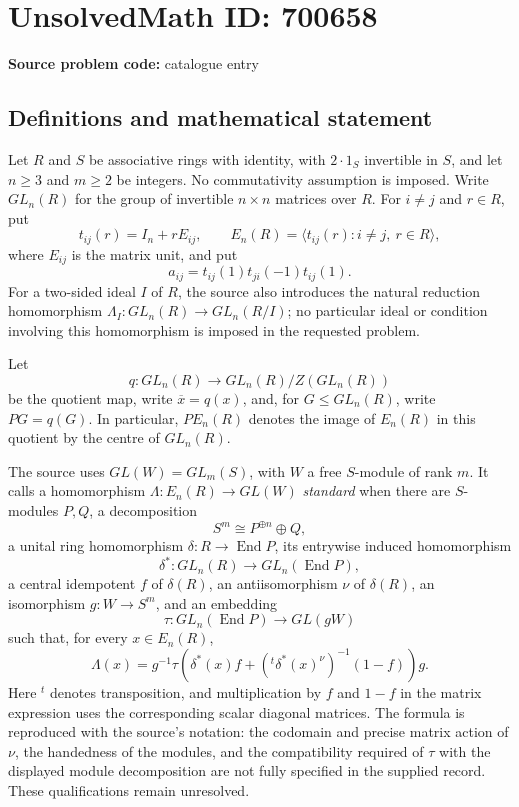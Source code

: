 \documentclass[11pt]{article}
\begin{document}
\section*{UnsolvedMath ID: 700658}
\textbf{Source problem code:} catalogue entry
\subsection{Definitions and mathematical statement}
Let \(R\) and \(S\) be associative rings with identity, with \(2\cdot 1_S\) invertible in \(S\), and let \(n\geq 3\) and \(m\geq 2\) be integers. No commutativity assumption is imposed. Write \(GL_n(R)\) for the group of invertible \(n\times n\) matrices over \(R\). For \(i\neq j\) and \(r\in R\), put
\[
t_{ij}(r)=I_n+rE_{ij},\qquad
E_n(R)=\langle t_{ij}(r):i\neq j,\ r\in R\rangle,
\]
where \(E_{ij}\) is the matrix unit, and put
\[
a_{ij}=t_{ij}(1)t_{ji}(-1)t_{ij}(1).
\]
For a two-sided ideal \(I\) of \(R\), the source also introduces the natural reduction homomorphism \(\Lambda_I:GL_n(R)\to GL_n(R/I)\); no particular ideal or condition involving this homomorphism is imposed in the requested problem.

Let
\[
q:GL_n(R)\longrightarrow GL_n(R)/Z(GL_n(R))
\]
be the quotient map, write \(\overline{x}=q(x)\), and, for \(G\leq GL_n(R)\), write \(PG=q(G)\). In particular, \(PE_n(R)\) denotes the image of \(E_n(R)\) in this quotient by the centre of \(GL_n(R)\).

The source uses \(GL(W)=GL_m(S)\), with \(W\) a free \(S\)-module of rank \(m\). It calls a homomorphism \(\Lambda:E_n(R)\to GL(W)\) \emph{standard} when there are \(S\)-modules \(P,Q\), a decomposition
\[
S^m\cong P^{\oplus n}\oplus Q,
\]
a unital ring homomorphism \(\delta:R\to\operatorname{End}P\), its entrywise induced homomorphism
\[
\delta^*:GL_n(R)\longrightarrow GL_n(\operatorname{End}P),
\]
a central idempotent \(f\) of \(\delta(R)\), an antiisomorphism \(\nu\) of \(\delta(R)\), an isomorphism \(g:W\to S^m\), and an embedding
\[
\tau:GL_n(\operatorname{End}P)\longrightarrow GL(gW)
\]
such that, for every \(x\in E_n(R)\),
\[
\Lambda(x)=g^{-1}\tau\!\left(
\delta^*(x)f+
\left({}^{t}\delta^*(x)^{\nu}\right)^{-1}(1-f)
\right)g.
\]
Here \({}^{t}\) denotes transposition, and multiplication by \(f\) and \(1-f\) in the matrix expression uses the corresponding scalar diagonal matrices. The formula is reproduced with the source's notation: the codomain and precise matrix action of \(\nu\), the handedness of the modules, and the compatibility required of \(\tau\) with the displayed module decomposition are not fully specified in the supplied record. These qualifications remain unresolved.
\end{document}
